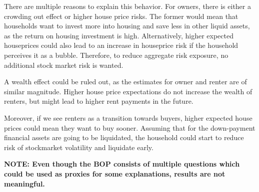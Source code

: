 \documentclass[ProjectABM]{subfiles}
\begin{document}






There are multiple reasons to explain this behavior. For owners, there is either a crowding out effect or higher house price risks. The former would mean that households want to invest more into housing and save less in other liquid assets, as the return on housing investment is high. Alternatively, higher expected houseprices could also lead to an increase in houseprice risk if the household perceives it as a bubble. Therefore, to reduce aggregate risk exposure, no additional stock market risk is wanted.

A wealth effect could be ruled out, as the estimates for owner and renter are of similar magnitude. Higher house price expectations do not increase the wealth of renters, but might lead to higher rent payments in the future. 

Moreover, if we see renters as a transition towards buyers, higher expected house prices could mean they want to buy sooner. Assuming that for the down-payment financial assets are going to be liquidated, the household could start to reduce risk of stockmarket volatility and liquidate early.

\textbf{NOTE: Even though the BOP consists of multiple questions which could be used as proxies for some explanations, results are not meaningful.}

\end{document}
